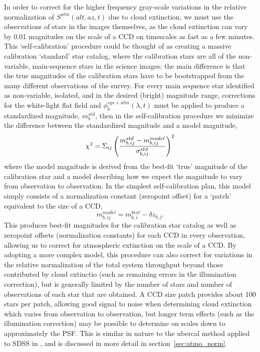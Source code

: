 \documentclass[12pt,preprint]{aastex}
\begin{document}
In order to correct for the higher
frequency gray-scale variations in the relative normalization of
$S^{atm}(alt,az,t)$ due to cloud extinction, we must use the
observations of stars in the images themselves, as the cloud
extinction can vary by 0.01 magnitudes on the scale of a CCD
\citep{Ivezic2007} on timescales as fast as a few minutes. This
`self-calibration' procedure could be thought of as creating a massive
calibration `standard' star catalog, where the calibration stars are
all of the non-variable, main-sequence stars in the science images;
the main difference is that the true magnitudes of the calibration
stars have to be bootstrapped from the many different observations of
the survey. For every main sequence star identified as non-variable,
isolated, and in the desired (bright) magnitude range, corrections for
the white-light flat field and $\phi_b^{sys+atm}(\lambda,t)$ must be
applied to produce a standardized magnitude, $m_b^{std}$, then in the
self-calibration procedure we minimize the difference between the
standardized magnitude and a model magnitude,
\begin{equation}
\label{eqn:chi2}
\chi^2 = \Sigma_{ij} \left( { m_{b,ij}^{std} - m_{b,ij}^{model} \over
\sigma_{b,ij}^{std} } \right)^2
\end{equation}
where the model magnitude is derived from the best-fit `true'
magnitude of the calibration star and a model describing how we expect
the magnitude to vary from observation to observation. In the simplest
self-calibration plan, this model simply consists of a normalization constant
(zeropoint offset) for a `patch' equivalent to the size of a CCD,
\begin{equation}
\label{eqn:modelmag}
m_{b,ij}^{model} = m_{b,i}^{best} - \delta z_{b,j}.
\end{equation}
This produces best-fit magnitudes for the calibration star catalog as
well as zeropoint offsets (normalization constants) for each CCD in
every observation, allowing us to correct for atmospheric extinction
on the scale of a CCD. By adopting a more complex model, this
procedure can also correct for variations in the relative
normalization of the total system throughput beyond those contributed
by cloud extinctio (such as remaining errors in the illumination
correction), but is generally limited by the number of stars and
number of observations of each star that are obtained. A CCD size
patch provides about 100 stars per patch, allowing good signal to
noise when determining cloud extinction which varies from observation
to observation, but longer term effects (such as the illumination
correction) may be possible to determine on scales down to approximately
the PSF.  This is similar in nature to the ubercal method applied to
SDSS in \citet{Padmanabhan2008}, and is discussed in more detail in
section~\ref{sec:atmo_norm}.
\end{document}
